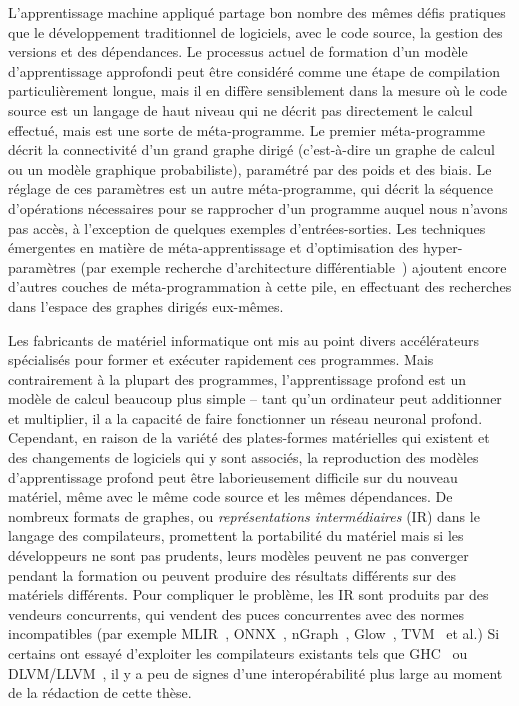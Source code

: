 L'apprentissage machine appliqué partage bon nombre des mêmes défis pratiques que le développement traditionnel de logiciels, avec le code source, la gestion des versions et des dépendances. Le processus actuel de formation d'un modèle d'apprentissage approfondi peut être considéré comme une étape de compilation particulièrement longue, mais il en diffère sensiblement dans la mesure où le code source est un langage de haut niveau qui ne décrit pas directement le calcul effectué, mais est une sorte de méta-programme. Le premier méta-programme décrit la connectivité d'un grand graphe dirigé (c'est-à-dire un graphe de calcul ou un modèle graphique probabiliste), paramétré par des poids et des biais. Le réglage de ces paramètres est un autre méta-programme, qui décrit la séquence d'opérations nécessaires pour se rapprocher d'un programme auquel nous n'avons pas accès, à l'exception de quelques exemples d'entrées-sorties. Les techniques émergentes en matière de méta-apprentissage et d'optimisation des hyper-paramètres (par exemple recherche d'architecture différentiable~\citep{liu2018darts}) ajoutent encore d'autres couches de méta-programmation à cette pile, en effectuant des recherches dans l'espace des graphes dirigés eux-mêmes.

Les fabricants de matériel informatique ont mis au point divers accélérateurs spécialisés pour former et exécuter rapidement ces programmes. Mais contrairement à la plupart des programmes, l'apprentissage profond est un modèle de calcul beaucoup plus simple -- tant qu'un ordinateur peut additionner et multiplier, il a la capacité de faire fonctionner un réseau neuronal profond. Cependant, en raison de la variété des plates-formes matérielles qui existent et des changements de logiciels qui y sont associés, la reproduction des modèles d'apprentissage profond peut être laborieusement difficile sur du nouveau matériel, même avec le même code source et les mêmes dépendances. De nombreux formats de graphes, ou \textit{représentations intermédiaires} (IR) dans le langage des compilateurs, promettent la portabilité du matériel mais si les développeurs ne sont pas prudents, leurs modèles peuvent ne pas converger pendant la formation ou peuvent produire des résultats différents sur des matériels différents. Pour compliquer le problème, les IR sont produits par des vendeurs concurrents, qui vendent des puces concurrentes avec des normes incompatibles (par exemple MLIR~\citep{mlir}, ONNX~\citep{bai2019}, nGraph~\citep{cyphers2018intel}, Glow~\citep{rotem2018glow}, TVM~\citep{tvm2018} et al.) Si certains ont essayé d'exploiter les compilateurs existants tels que GHC~\citep{elliott2018simple} ou DLVM/LLVM~\citep{wei2017dlvm}, il y a peu de signes d'une interopérabilité plus large au moment de la rédaction de cette thèse.

